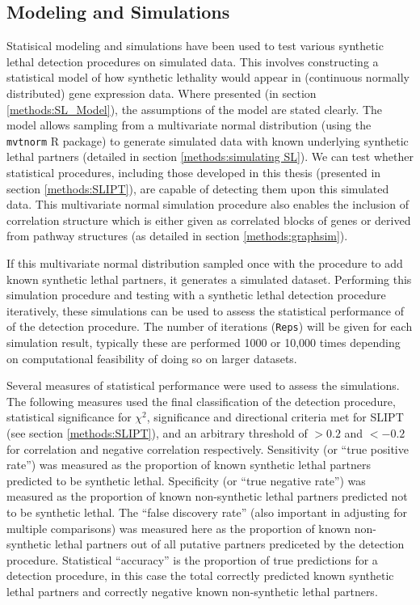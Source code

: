 \subsection{Modeling and Simulations}
Statisical modeling and simulations have been used to test various synthetic lethal detection procedures on simulated data. This involves constructing a statistical model of how synthetic lethality would appear in (continuous normally distributed) gene expression data. Where presented (in section \ref{methods:SL_Model}), the assumptions of the model are stated clearly. The model allows sampling from a multivariate normal distribution (using the \texttt{mvtnorm} R package) to generate simulated data with known underlying synthetic lethal partners (detailed in section \ref{methods:simulating SL}). We can test whether statistical procedures, including those developed in this thesis (presented in section \ref{methods:SLIPT}), are capable of detecting them upon this simulated data. This multivariate normal simulation procedure also enables the inclusion of correlation structure which is either given as correlated blocks of genes or derived from pathway structures (as detailed in section \ref{methods:graphsim}).

If this multivariate normal distribution sampled once with the procedure to add known synthetic lethal partners, it generates a simulated dataset. Performing this simulation procedure and testing with a synthetic lethal detection procedure iteratively, these simulations can be used to assess the statistical performance of of the detection procedure. The number of iterations (\texttt{Reps}) will be given for each simulation result, typically these are performed 1000 or 10,000 times depending on computational feasibility of doing so on larger datasets. 

Several measures of statistical performance were used to assess the simulations. The following measures used the final classification of the detection procedure, statistical significance for $\chi^2$, significance and directional criteria met for SLIPT (see section \ref{methods:SLIPT}), and an arbitrary threshold of $>0.2$ and $<-0.2$ for correlation and negative correlation respectively. Sensitivity (or ``true positive rate'') was measured as the proportion of known synthetic lethal partners predicted to be synthetic lethal. Specificity (or ``true negative rate'') was measured as the proportion of known non-synthetic lethal partners predicted not to be synthetic lethal. The ``false discovery rate'' (also important in adjusting for multiple comparisons) was measured here as the proportion of known non-synthetic lethal partners out of all putative partners prediceted by the detection procedure. Statistical ``accuracy'' is the proportion of true predictions for a detection procedure, in this case the total correctly predicted known synthetic lethal partners and correctly negative known non-synthetic lethal partners.

